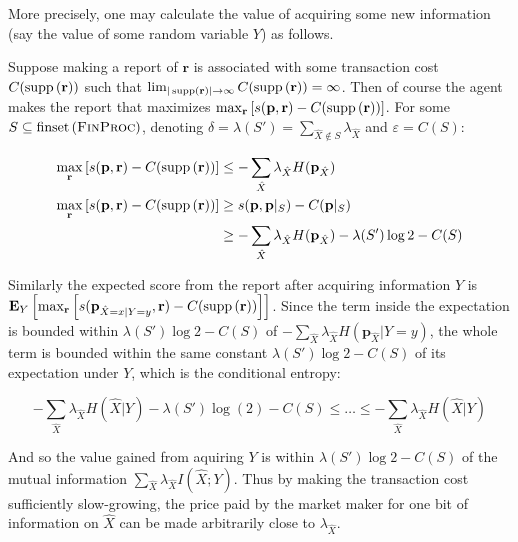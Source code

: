 \documentclass{article}
\begin{document}
More precisely, one may calculate the value of acquiring some new information (say the value of some random variable $Y$) as follows. 

Suppose making a report of $\mathbf{r}$ is associated with some transaction cost $C(\operatorname{supp}\left(\mathbf{r}\right))$ such that $\lim_{|\operatorname{supp}\left(\mathbf{r}\right)|\to\infty}C(\operatorname{supp}\left(\mathbf{r}\right))=\infty$. Then of course the agent makes the report that maximizes $\max_{\mathbf{r}} \left[s(\mathbf{p}, \mathbf{r}) - C(\operatorname{supp}\left(\mathbf{r}\right))\right]$. For some $S\subseteq\finset{\FinProc}$, denoting $\delta=\lambda(S')=\sum_{\hat{X}\notin S}\lambda_{\hat{X}}$ and $\varepsilon=C(S)$: 

\begin{align*}
    \max_{\mathbf{r}} \left[s(\mathbf{p}, \mathbf{r}) - C(\operatorname{supp}\left(\mathbf{r}\right))\right] &\le -\sum_{\hat{X}}\lambda_{\hat{X}}H(\mathbf{p}_{\hat{X}}) \\
    \max_{\mathbf{r}} \left[s(\mathbf{p}, \mathbf{r}) - C(\operatorname{supp}\left(\mathbf{r}\right))\right] &\ge s(\mathbf{p}, \mathbf{p}|_S) - C(\mathbf{p}|_S) \\
    &\ge -\sum_{\hat{X}}\lambda_{\hat{X}}H(\mathbf{p}_{\hat{X}}) - \lambda(S')\log2 - C(S)
\end{align*}

Similarly the expected score from the report after acquiring information $Y$ is $\mathbf{E}_{Y}\left[\max_{\mathbf{r}}\left[s(\mathbf{p}_{\hat{X}=x|Y=y}, \mathbf{r}) - C(\operatorname{supp}\left(\mathbf{r}\right))\right]\right]$. Since the term inside the expectation is bounded within $\lambda(S')\log2-C(S)$ of $-\sum_{\hat{X}}\lambda_{\hat{X}}H(\mathbf{p}_{\hat{X}}|Y=y)$, the whole term is bounded within the same constant $\lambda(S')\log2-C(S)$ of its expectation under $Y$, which is the conditional entropy:

\begin{equation*}
    -\sum_{\hat{X}}\lambda_{\hat{X}}H(\hat{X}|Y)-\lambda(S')\log(2)-C(S) \le \dots \le -\sum_{\hat{X}}\lambda_{\hat{X}}H(\hat{X}|Y)
\end{equation*}

And so the value gained from aquiring $Y$ is within $\lambda(S')\log2-C(S)$ of the mutual information $\sum_{\hat{X}}{\lambda_{\hat{X}}I(\hat{X}; Y)}$. Thus by making the transaction cost sufficiently slow-growing, the price paid by the market maker for one bit of information on $\hat{X}$ can be made arbitrarily close to $\lambda_{\hat{X}}$.
\end{document}
